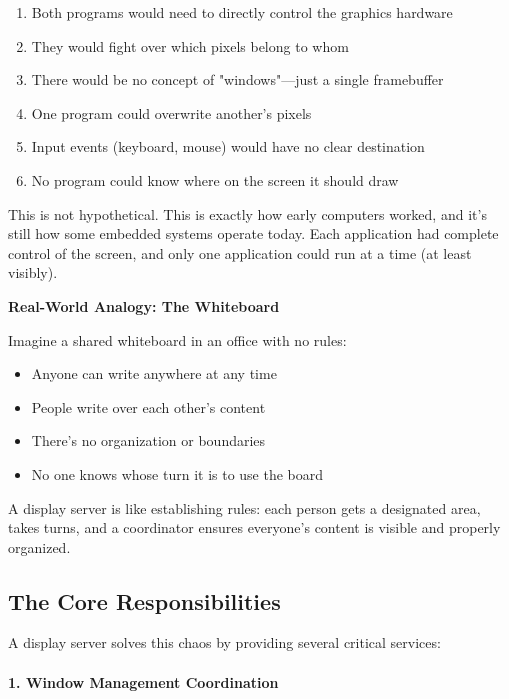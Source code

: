 \begin{enumerate}[leftmargin=*]
    \item Both programs would need to directly control the graphics hardware
    \item They would fight over which pixels belong to whom
    \item There would be no concept of "windows"—just a single framebuffer
    \item One program could overwrite another's pixels
    \item Input events (keyboard, mouse) would have no clear destination
    \item No program could know where on the screen it should draw
\end{enumerate}

This is not hypothetical. This is exactly how early computers worked, and it's still how some embedded systems operate today. Each application had complete control of the screen, and only one application could run at a time (at least visibly).

\begin{examplebox}
\textbf{Real-World Analogy: The Whiteboard}

Imagine a shared whiteboard in an office with no rules:
\begin{itemize}
    \item Anyone can write anywhere at any time
    \item People write over each other's content
    \item There's no organization or boundaries
    \item No one knows whose turn it is to use the board
\end{itemize}

A display server is like establishing rules: each person gets a designated area, takes turns, and a coordinator ensures everyone's content is visible and properly organized.
\end{examplebox}

\subsection{The Core Responsibilities}

A display server solves this chaos by providing several critical services:

\paragraph{1. Window Management Coordination}

